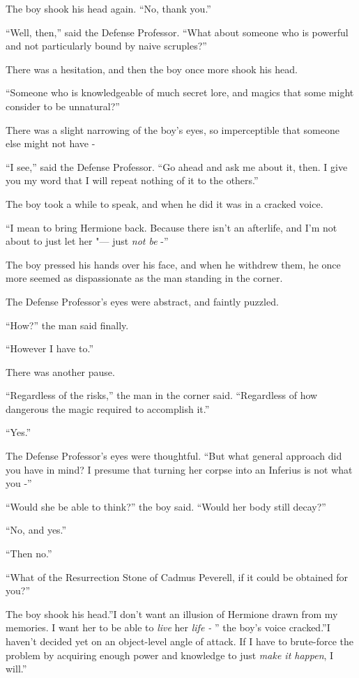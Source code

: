 The boy shook his head again. ``No, thank you.''

``Well, then,'' said the Defense Professor. ``What about someone who is
powerful and not particularly bound by naive scruples?''

There was a hesitation, and then the boy once more shook his head.

``Someone who is knowledgeable of much secret lore, and magics that some
might consider to be unnatural?''

There was a slight narrowing of the boy's eyes, so imperceptible that
someone else might not have -

``I see,'' said the Defense Professor. ``Go ahead and ask me about it,
then. I give you my word that I will repeat nothing of it to the
others.''

The boy took a while to speak, and when he did it was in a cracked
voice.

``I mean to bring Hermione back. Because there isn't an afterlife, and
I'm not about to just let her "--- just \emph{not be} -''

The boy pressed his hands over his face, and when he withdrew them, he
once more seemed as dispassionate as the man standing in the corner.

The Defense Professor's eyes were abstract, and faintly puzzled.

``How?'' the man said finally.

``However I have to.''

There was another pause.

``Regardless of the risks,'' the man in the corner said. ``Regardless of
how dangerous the magic required to accomplish it.''

``Yes.''

The Defense Professor's eyes were thoughtful. ``But what general
approach did you have in mind? I presume that turning her corpse into an
Inferius is not what you -''

``Would she be able to think?'' the boy said. ``Would her body still
decay?''

``No, and yes.''

``Then no.''

``What of the Resurrection Stone of Cadmus Peverell, if it could be
obtained for you?''

The boy shook his head.''I don't want an illusion of Hermione drawn from
my memories. I want her to be able to \emph{live} her \emph{life -} ''
the boy's voice cracked.''I haven't decided yet on an object-level angle
of attack. If I have to brute-force the problem by acquiring enough
power and knowledge to just \emph{make it happen}, I will.''

